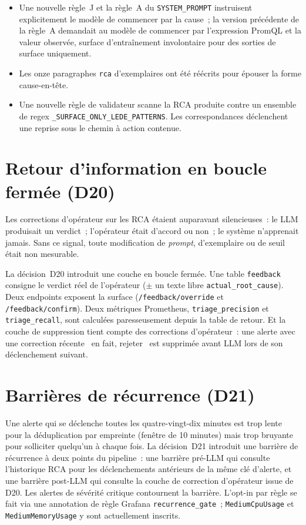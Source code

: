 \documentclass[11pt,a4paper,oneside]{report}
\begin{document}
\begin{itemize}
  \item Une nouvelle règle~J et la règle~A du \texttt{SYSTEM\_PROMPT}
        instruisent explicitement le modèle de commencer par la
        cause~; la version précédente de la règle~A demandait au
        modèle de commencer par l'expression PromQL et la valeur
        observée, surface d'entraînement involontaire pour des
        sorties de surface uniquement.
  \item Les onze paragraphes \texttt{rca} d'exemplaires ont été
        réécrits pour épouser la forme cause-en-tête.
  \item Une nouvelle règle de validateur scanne la RCA produite
        contre un ensemble de regex
        \texttt{\_SURFACE\_ONLY\_LEDE\_PATTERNS}. Les correspondances
        déclenchent une reprise sous le chemin à action contenue.
\end{itemize}

\section{Retour d'information en boucle fermée (D20)}

Les corrections d'opérateur sur les RCA étaient auparavant
silencieuses~: le LLM produisait un verdict~; l'opérateur était
d'accord ou non~; le système n'apprenait jamais. Sans ce signal,
toute modification de \emph{prompt}, d'exemplaire ou de seuil était
non mesurable.

La décision~D20 introduit une couche en boucle fermée. Une table
\texttt{feedback} consigne le verdict réel de l'opérateur ($\pm$ un
texte libre \texttt{actual\_root\_cause}). Deux endpoints exposent
la surface (\texttt{/feedback/override} et
\texttt{/feedback/confirm}). Deux métriques Prometheus,
\texttt{triage\_precision} et \texttt{triage\_recall}, sont
calculées paresseusement depuis la table de retour. Et la couche de
suppression tient compte des corrections d'opérateur~: une alerte
avec une correction récente \og~en fait, rejeter~\fg{} est
supprimée avant LLM lors de son déclenchement suivant.

\section{Barrières de récurrence (D21)}

Une alerte qui se déclenche toutes les quatre-vingt-dix minutes est
trop lente pour la déduplication par empreinte (fenêtre de 10
minutes) mais trop bruyante pour solliciter quelqu'un à chaque fois.
La décision~D21 introduit une barrière de récurrence à deux points
du pipeline~: une barrière pré-LLM qui consulte l'historique RCA
pour les déclenchements antérieurs de la même clé d'alerte, et une
barrière post-LLM qui consulte la couche de correction d'opérateur
issue de D20. Les alertes de sévérité critique contournent la
barrière. L'opt-in par règle se fait via une annotation de règle
Grafana \texttt{recurrence\_gate}~; \texttt{MediumCpuUsage} et
\texttt{MediumMemoryUsage} y sont actuellement inscrits.
\end{document}
